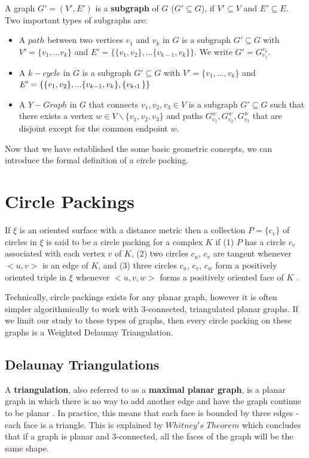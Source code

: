 \documentclass[11pt]{article}
\begin{document}
  A graph $G' = (V',E')$ is a \textbf{subgraph} of $G$ ($G' \subseteq G$), if $V' \subseteq V$ and $E' \subseteq E$. Two important types of subgraphs are:
  \begin{itemize}
  \item A $path$ between two vertices $v_1$ and $v_k$ in $G$ is a subgraph $G' \subseteq G$ with $V' = \{v_1,...v_k\}$ and 
  $E' 	= \{\{v_1,v_2\},...\{v_{k-1}, v_k\}\}$. We write $G' = G_{v_1}^{v_k}$.
  \item A $k-cycle$ in $G$ is a subgraph $G'\subseteq G$ with $V' = \{v_1,...,v_k\}$ and 
  $E' = \\ \{\{v_1,v_2\},...\{v_{k-1}, v_k\}, \{v_k,_1\}\}$
  \item A $Y-Graph$ in $G$ that connects $v_1,v_2, v_3 \in V$ is a subgraph $G' \subseteq G$ such that there exists a vertex $w \in V \backslash \{v_1,v_2, v_3\}$ and paths $G_{v_1}^w, G_{v_2}^w, G_{v_3}^w$ that are disjoint except for the common endpoint $w$.
  \end{itemize}
  
Now that we have established the some basic geometric concepts, we can introduce the formal definition of a circle packing.

\section{Circle Packings}
If $\xi$ is an oriented surface with a distance metric then a collection $P = \{c_v\}$ of circles in $\xi$ is said to be a circle packing for a complex $K$ if (1) $P$ has a circle $c_v$ associated with each vertex $v$ of $K$, (2) two circles $c_u$, $c_v$ are tangent whenever $<u,v>$ is an edge of $K$, and (3) three circles $c_u$, $c_v$, $c_w$ form a positively oriented triple in $\xi$ whenever $<u,v,w>$ forms a positively oriented face of $K$ \cite{stephenson05introduction}. 

Technically, circle packings exists for any planar graph, however it is often simpler algorithmically to work with 3-connected, triangulated planar graphs. If we limit our study to these types of graphs, then every circle packing on these graphs is a Weighted Delaunay Triangulation. 

\subsection{Delaunay Triangulations}
	A \textbf{triangulation}, also referred to as a \textbf{maximal planar graph}, is a planar graph in which there is no way to add another edge and have the graph continue to be planar \cite{meshGeneration}. In practice, this means that each face is bounded by three edges - each face is a triangle. This is explained by $Whitney's$ $Theorem$ which concludes that if a graph is planar and 3-connected, all the faces of the graph will be the same shape.
\end{document}
